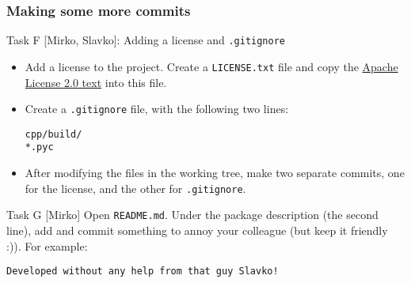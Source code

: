 \begin{frame}[fragile]

\frametitle{Making some more commits}

\begin{block}{Task F [Mirko, Slavko]: Adding a license and \texttt{.gitignore}}
	\begin{itemize}
	\item Add a license to the project. Create a \texttt{LICENSE.txt} file and copy the \href{https://www.apache.org/licenses/LICENSE-2.0.txt}{Apache License 2.0 text} into this file.
	\item Create a \texttt{.gitignore} file, with the following two lines:
	\begin{verbatim}
cpp/build/
*.pyc
	\end{verbatim}
	\item After modifying the files in the working tree, make two separate commits, one for the license, and the other for \texttt{.gitignore}.
	\end{itemize}
\end{block}

\begin{block}{Task G [Mirko]}
	Open \texttt{README.md}. Under the package description (the second line), add and commit something to annoy your colleague (but keep it friendly :)). For example:
	\begin{verbatim}
Developed without any help from that guy Slavko!
	\end{verbatim}
\end{block}

\end{frame}


